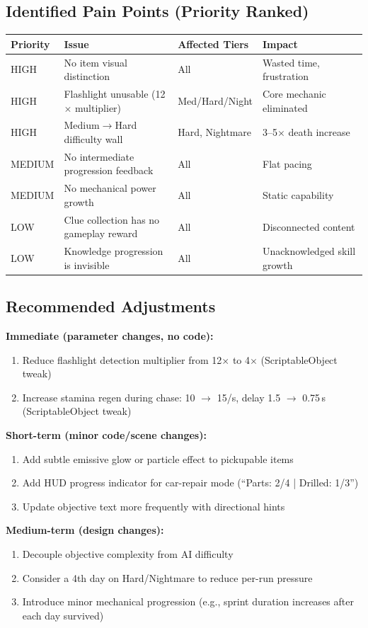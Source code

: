 \documentclass[11pt]{article}
\begin{document}
\subsection{Identified Pain Points (Priority Ranked)}

\begin{table}[h]
\centering
\small
\begin{tabular}{@{}llll@{}}
\toprule
\textbf{Priority} & \textbf{Issue} & \textbf{Affected Tiers} & \textbf{Impact} \\
\midrule
HIGH & No item visual distinction & All & Wasted time, frustration \\
HIGH & Flashlight unusable (12$\times$ multiplier) & Med/Hard/Night & Core mechanic eliminated \\
HIGH & Medium$\to$Hard difficulty wall & Hard, Nightmare & 3--5$\times$ death increase \\
MEDIUM & No intermediate progression feedback & All & Flat pacing \\
MEDIUM & No mechanical power growth & All & Static capability \\
LOW & Clue collection has no gameplay reward & All & Disconnected content \\
LOW & Knowledge progression is invisible & All & Unacknowledged skill growth \\
\bottomrule
\end{tabular}
\end{table}

\subsection{Recommended Adjustments}

\textbf{Immediate (parameter changes, no code):}
\begin{enumerate}[nosep]
\item Reduce flashlight detection multiplier from 12$\times$ to 4$\times$ (ScriptableObject tweak)
\item Increase stamina regen during chase: 10 $\to$ 15/s, delay 1.5 $\to$ 0.75\,s (ScriptableObject tweak)
\end{enumerate}

\textbf{Short-term (minor code/scene changes):}
\begin{enumerate}[nosep,start=3]
\item Add subtle emissive glow or particle effect to pickupable items
\item Add HUD progress indicator for car-repair mode (``Parts: 2/4 | Drilled: 1/3'')
\item Update objective text more frequently with directional hints
\end{enumerate}

\textbf{Medium-term (design changes):}
\begin{enumerate}[nosep,start=6]
\item Decouple objective complexity from AI difficulty
\item Consider a 4th day on Hard/Nightmare to reduce per-run pressure
\item Introduce minor mechanical progression (e.g., sprint duration increases after each day survived)
\end{enumerate}
\end{document}
